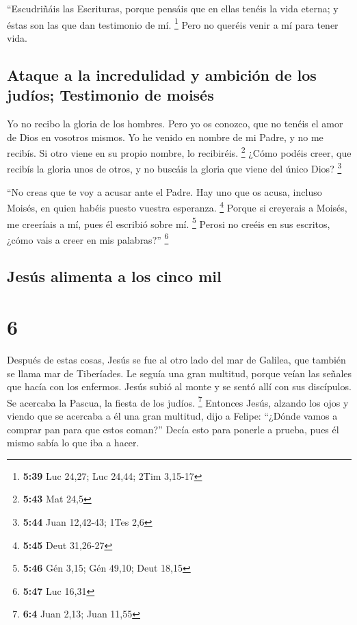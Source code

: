  ``Escudriñáis las Escrituras, porque pensáis que en
ellas tenéis la vida eterna; y éstas son las que dan testimonio de mí.
\footnote{\textbf{5:39} Luc 24,27; Luc 24,44; 2Tim 3,15-17}
 Pero no queréis venir a mí para tener vida.

\hypertarget{ataque-a-la-incredulidad-y-ambiciuxf3n-de-los-juduxedos-testimonio-de-moisuxe9s}{%
\subsection{Ataque a la incredulidad y ambición de los judíos;
Testimonio de
moisés}\label{ataque-a-la-incredulidad-y-ambiciuxf3n-de-los-juduxedos-testimonio-de-moisuxe9s}}

 Yo no recibo la gloria de los hombres. 
Pero yo os conozco, que no tenéis el amor de Dios en vosotros mismos.
 Yo he venido en nombre de mi Padre, y no me recibís. Si
otro viene en su propio nombre, lo recibiréis. \footnote{\textbf{5:43}
  Mat 24,5}  ¿Cómo podéis creer, que recibís la gloria
unos de otros, y no buscáis la gloria que viene del único Dios?
\footnote{\textbf{5:44} Juan 12,42-43; 1Tes 2,6}

 ``No creas que te voy a acusar ante el Padre. Hay uno
que os acusa, incluso Moisés, en quien habéis puesto vuestra esperanza.
\footnote{\textbf{5:45} Deut 31,26-27}  Porque si
creyerais a Moisés, me creeríais a mí, pues él escribió sobre mí.
\footnote{\textbf{5:46} Gén 3,15; Gén 49,10; Deut 18,15} 
Perosi no creéis en sus escritos, ¿cómo vais a creer en mis palabras?''
\footnote{\textbf{5:47} Luc 16,31}

\hypertarget{jesuxfas-alimenta-a-los-cinco-mil}{%
\subsection{Jesús alimenta a los cinco
mil}\label{jesuxfas-alimenta-a-los-cinco-mil}}

\hypertarget{section-5}{%
\section{6}\label{section-5}}

 Después de estas cosas, Jesús se fue al otro lado del mar
de Galilea, que también se llama mar de Tiberíades.  Le
seguía una gran multitud, porque veían las señales que hacía con los
enfermos.  Jesús subió al monte y se sentó allí con sus
discípulos.  Se acercaba la Pascua, la fiesta de los
judíos. \footnote{\textbf{6:4} Juan 2,13; Juan 11,55} 
Entonces Jesús, alzando los ojos y viendo que se acercaba a él una gran
multitud, dijo a Felipe: ``¿Dónde vamos a comprar pan para que estos
coman?''  Decía esto para ponerle a prueba, pues él mismo
sabía lo que iba a hacer.

